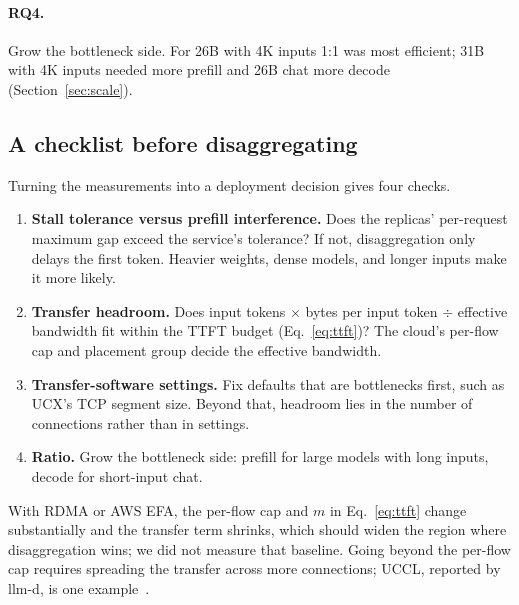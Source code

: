\documentclass[11pt]{article}
\begin{document}
\paragraph{RQ4.} Grow the bottleneck side. For 26B with 4K inputs 1:1 was most efficient; 31B with 4K inputs needed more prefill and 26B chat more decode (Section~\ref{sec:scale}).

\subsection{A checklist before disaggregating}
Turning the measurements into a deployment decision gives four checks.
\begin{enumerate}
  \item \textbf{Stall tolerance versus prefill interference.} Does the replicas' per-request maximum gap exceed the service's tolerance? If not, disaggregation only delays the first token. Heavier weights, dense models, and longer inputs make it more likely.
  \item \textbf{Transfer headroom.} Does input tokens $\times$ bytes per input token $\div$ effective bandwidth fit within the TTFT budget (Eq.~\eqref{eq:ttft})? The cloud's per-flow cap and placement group decide the effective bandwidth.
  \item \textbf{Transfer-software settings.} Fix defaults that are bottlenecks first, such as UCX's TCP segment size. Beyond that, headroom lies in the number of connections rather than in settings.
  \item \textbf{Ratio.} Grow the bottleneck side: prefill for large models with long inputs, decode for short-input chat.
\end{enumerate}

With RDMA or AWS EFA, the per-flow cap and $m$ in Eq.~\eqref{eq:ttft} change substantially and the transfer term shrinks, which should widen the region where disaggregation wins; we did not measure that baseline. Going beyond the per-flow cap requires spreading the transfer across more connections; UCCL, reported by llm-d, is one example~\cite{llmdblog}.
\end{document}
